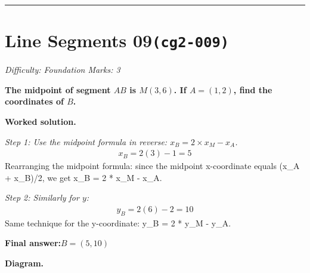 \documentclass[11pt]{article}
\newcommand{\question}[1]{\par\medskip\noindent\textbf{#1}\par}
\begin{document}
\medskip\hrule

\section*{Line Segments 09\quad\small\texttt{(cg2-009)}}
\textit{Difficulty: Foundation \quad\textbar\quad Marks: 3}

\question{The midpoint of segment \( AB \) is \( M(3, 6) \). If \( A = (1, 2) \), find the coordinates of \( B \).}

\textbf{Worked solution.}

\textit{Step 1: Use the midpoint formula in reverse: \( x_B = 2 \times x_M - x_A \).}
\[\begin{gathered}
x_B = 2(3) - 1 = 5
\end{gathered}\]
Rearranging the midpoint formula: since the midpoint x-coordinate equals (x\_A + x\_B)/2, we get x\_B = 2 * x\_M - x\_A.

\textit{Step 2: Similarly for \( y \):}
\[\begin{gathered}
y_B = 2(6) - 2 = 10
\end{gathered}\]
Same technique for the y-coordinate: y\_B = 2 * y\_M - y\_A.

\begin{answerbox}
\textbf{Final answer:}\quad \(\displaystyle B = (5, 10)\)
\end{answerbox}
\textbf{Diagram.}
\end{document}
